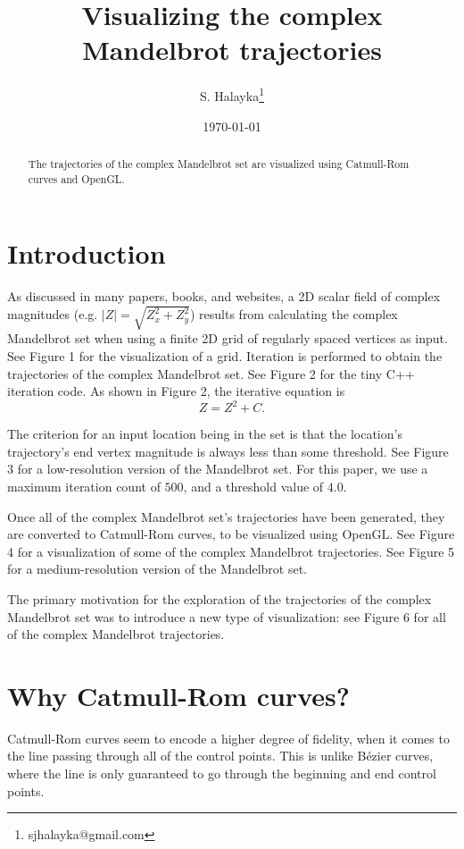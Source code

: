 \documentclass[12pt]{article}
\title{Visualizing the complex Mandelbrot trajectories}
\author{S. Halayka\footnote{sjhalayka@gmail.com}}
\date{\today}
\begin{document}
\maketitle

\begin{abstract}
The trajectories of the complex Mandelbrot set are visualized using Catmull-Rom curves and OpenGL.
\end{abstract}



\section{Introduction}

As discussed in many papers, books, and websites, a 2D scalar field of complex magnitudes (e.g. $|Z| = \sqrt{Z_x^2 + Z_y^2}$) results from calculating the complex Mandelbrot set when using a finite 2D grid of regularly spaced vertices as input.
See Figure 1 for the visualization of a grid.
Iteration is performed to obtain the trajectories of the complex Mandelbrot set.
See Figure 2 for the tiny C++ iteration code.
As shown in Figure 2, the iterative equation is
\begin{equation}
Z = Z^2 + C.
\end{equation}

The criterion for an input location being in the set is that the location's trajectory's end vertex magnitude is always less than some threshold.
See Figure 3 for a low-resolution version of the Mandelbrot set.
For this paper, we use a maximum iteration count of $500$, and a threshold value of $4.0$.

Once all of the complex Mandelbrot set's trajectories have been generated, they are converted to Catmull-Rom curves, to be visualized using OpenGL. 
See Figure 4 for a visualization of some of the complex Mandelbrot trajectories.
See Figure 5 for a medium-resolution version of the Mandelbrot set.

The primary motivation for the exploration of the trajectories of the complex Mandelbrot set was to introduce a new type of visualization: see Figure 6 for all of the complex Mandelbrot trajectories.


\section{Why Catmull-Rom curves?}

Catmull-Rom curves seem to encode a higher degree of fidelity, when it comes to the line passing through all of the control points.
This is unlike B\'ezier curves, where the line is only guaranteed to go through the beginning and end control points.
\end{document}
